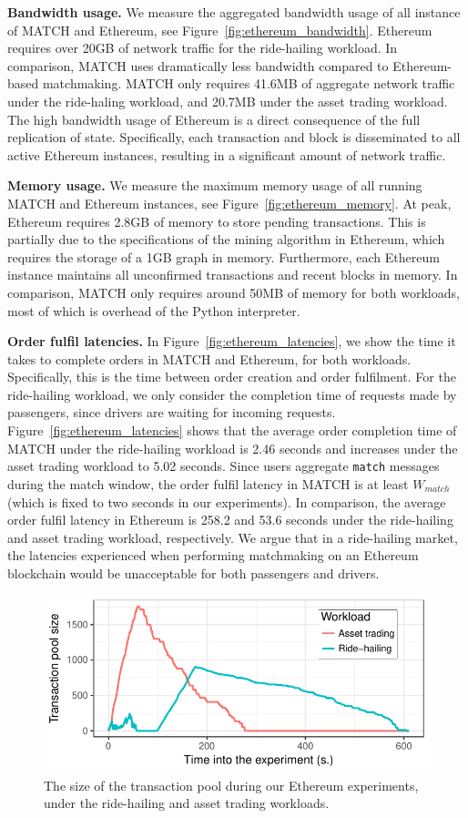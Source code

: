 \textbf{Bandwidth usage.}
We measure the aggregated bandwidth usage of all instance of MATCH and Ethereum, see Figure~\ref{fig:ethereum_bandwidth}.
Ethereum requires over 20GB of network traffic for the ride-hailing workload.
In comparison, MATCH uses dramatically less bandwidth compared to Ethereum-based matchmaking.
MATCH only requires 41.6MB of aggregate network traffic under the ride-haling workload, and 20.7MB under the asset trading workload.
The high bandwidth usage of Ethereum is a direct consequence of the full replication of state.
Specifically, each transaction and block is disseminated to all active Ethereum instances, resulting in a significant amount of network traffic.

\textbf{Memory usage.}
We measure the maximum memory usage of all running MATCH and Ethereum instances, see Figure~\ref{fig:ethereum_memory}.
At peak, Ethereum requires 2.8GB of memory to store pending transactions.
This is partially due to the specifications of the mining algorithm in Ethereum, which requires the storage of a 1GB graph in memory.
Furthermore, each Ethereum instance maintains all unconfirmed transactions and recent blocks in memory.
In comparison, MATCH only requires around 50MB of memory for both workloads, most of which is overhead of the Python interpreter.

\textbf{Order fulfil latencies.}
In Figure~\ref{fig:ethereum_latencies}, we show the time it takes to complete orders in MATCH and Ethereum, for both workloads.
Specifically, this is the time between order creation and order fulfilment.
For the ride-hailing workload, we only consider the completion time of requests made by passengers, since drivers are waiting for incoming requests.
Figure~\ref{fig:ethereum_latencies} shows that the average order completion time of MATCH under the ride-hailing workload is 2.46 seconds and increases under the asset trading workload to 5.02 seconds.
Since users aggregate \texttt{match} messages during the match window, the order fulfil latency in MATCH is at least $ W_{match} $ (which is fixed to two seconds in our experiments).
In comparison, the average order fulfil latency in Ethereum is 258.2 and 53.6 seconds under the ride-hailing and asset trading workload, respectively.
We argue that in a ride-hailing market, the latencies experienced when performing matchmaking on an Ethereum blockchain would be unacceptable for both passengers and drivers.

\begin{figure}[t]
	\centering
	\includegraphics[width=.8\linewidth]{match/assets/plots/tx_pool}
	\caption{The size of the transaction pool during our Ethereum experiments, under the ride-hailing and asset trading workloads.}
	\label{fig:ethereum_tx_pool}
\end{figure}

